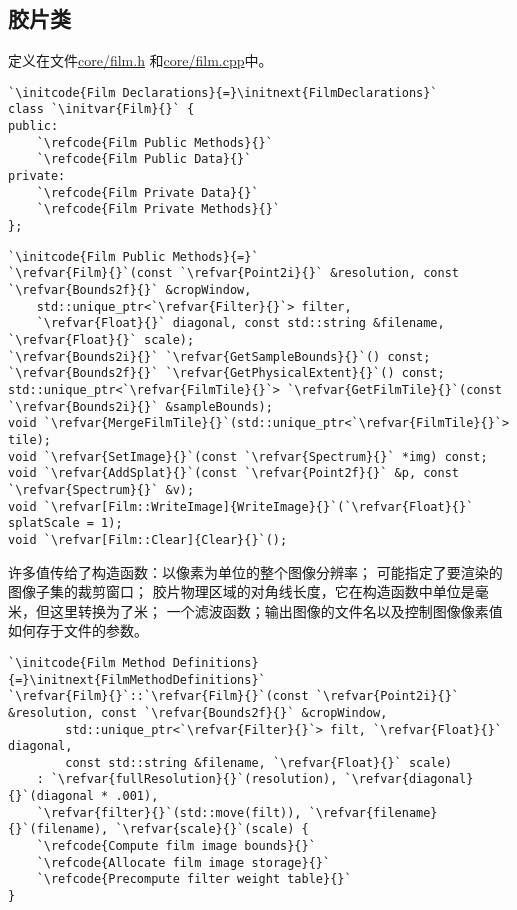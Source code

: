 \subsection{胶片类}\label{sub:胶片类}
定义在文件\href{https://github.com/mmp/pbrt-v3/blob/master/src/core/film.h}{\ttfamily core/film.h}
和\href{https://github.com/mmp/pbrt-v3/blob/master/src/core/film.cpp}{\ttfamily core/film.cpp}中。
\begin{lstlisting}
`\initcode{Film Declarations}{=}\initnext{FilmDeclarations}`
class `\initvar{Film}{}` {
public:
    `\refcode{Film Public Methods}{}`
    `\refcode{Film Public Data}{}`
private:
    `\refcode{Film Private Data}{}`
    `\refcode{Film Private Methods}{}`
};
\end{lstlisting}
\begin{lstlisting}
`\initcode{Film Public Methods}{=}`
`\refvar{Film}{}`(const `\refvar{Point2i}{}` &resolution, const `\refvar{Bounds2f}{}` &cropWindow,
    std::unique_ptr<`\refvar{Filter}{}`> filter,
    `\refvar{Float}{}` diagonal, const std::string &filename, `\refvar{Float}{}` scale);
`\refvar{Bounds2i}{}` `\refvar{GetSampleBounds}{}`() const;
`\refvar{Bounds2f}{}` `\refvar{GetPhysicalExtent}{}`() const;
std::unique_ptr<`\refvar{FilmTile}{}`> `\refvar{GetFilmTile}{}`(const `\refvar{Bounds2i}{}` &sampleBounds);
void `\refvar{MergeFilmTile}{}`(std::unique_ptr<`\refvar{FilmTile}{}`> tile);
void `\refvar{SetImage}{}`(const `\refvar{Spectrum}{}` *img) const;
void `\refvar{AddSplat}{}`(const `\refvar{Point2f}{}` &p, const `\refvar{Spectrum}{}` &v);
void `\refvar[Film::WriteImage]{WriteImage}{}`(`\refvar{Float}{}` splatScale = 1);
void `\refvar[Film::Clear]{Clear}{}`();
\end{lstlisting}

许多值传给了构造函数：以像素为单位的整个图像分辨率；
可能指定了要渲染的图像子集的裁剪窗口；
胶片物理区域的对角线长度，它在构造函数中单位是毫米，但这里转换为了米；
一个滤波函数；输出图像的文件名以及控制图像像素值如何存于文件的参数。
\begin{lstlisting}
`\initcode{Film Method Definitions}{=}\initnext{FilmMethodDefinitions}`
`\refvar{Film}{}`::`\refvar{Film}{}`(const `\refvar{Point2i}{}` &resolution, const `\refvar{Bounds2f}{}` &cropWindow,
        std::unique_ptr<`\refvar{Filter}{}`> filt, `\refvar{Float}{}` diagonal,
        const std::string &filename, `\refvar{Float}{}` scale)
    : `\refvar{fullResolution}{}`(resolution), `\refvar{diagonal}{}`(diagonal * .001),
    `\refvar{filter}{}`(std::move(filt)), `\refvar{filename}{}`(filename), `\refvar{scale}{}`(scale) {
    `\refcode{Compute film image bounds}{}`
    `\refcode{Allocate film image storage}{}`
    `\refcode{Precompute filter weight table}{}`
}
\end{lstlisting}

